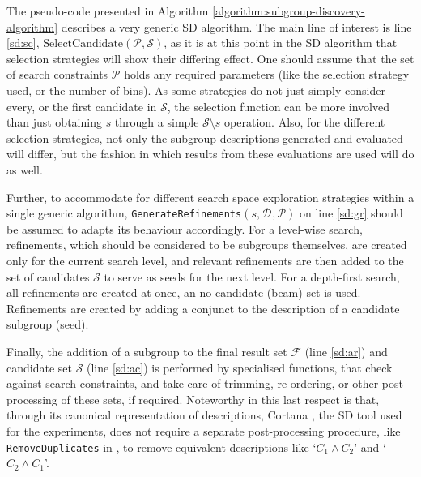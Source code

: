 \documentclass[smallextended]{svjour3}
\newcommand{\subgroup}[1]{\mbox{`$#1$'}}
\newcommand{\ds}[1]{\mathcal{D}_{#1}}
\newcommand{\sd}{SD}
\begin{document}
The pseudo-code presented in Algorithm \ref{algorithm:subgroup-discovery-algorithm} describes a very generic \sd{} algorithm.
The main line of interest is line \ref{sd:sc}, \texttt{$\text{SelectCandidate}(\mathcal{P}, \mathcal{S})$}, as it is at this point in the \sd{} algorithm that selection strategies will show their differing effect.
One should assume that the set of search constraints $\mathcal{P}$ holds any required parameters (like the selection strategy used, or the number of bins).
As some strategies do not just simply consider every, or the first candidate in $\mathcal{S}$, the selection function can be more involved than just obtaining $s$ through a simple $\mathcal{S} \setminus {s}$ operation.
Also, for the different selection strategies, not only the subgroup descriptions generated and evaluated will differ, but the fashion in which results from these evaluations are used will do as well.

Further, to accommodate for different search space exploration strategies within a single generic algorithm, \texttt{GenerateRefinements$(s, \ds{}, \mathcal{P})$} on line \ref{sd:gr} should be assumed to adapts its behaviour accordingly.
For a level-wise search, refinements, which should be considered to be subgroups themselves, are created only for the current search level, and relevant refinements are then added to the set of candidates $\mathcal{S}$ to serve as seeds for the next level.
For a depth-first search, all refinements are created at once, an no candidate (beam) set is used.
Refinements are created by adding a conjunct to the description of a candidate subgroup (seed).

Finally, the addition of a subgroup to the final result set $\mathcal{F}$ (line \ref{sd:ar}) and candidate set $\mathcal{S}$ (line \ref{sd:ac}) is performed by specialised functions, that check against search constraints, and take care of trimming, re-ordering, or other post-processing of these sets, if required.
Noteworthy in this last respect is that, through its canonical representation of descriptions, Cortana \cite{meeng:2011:cortana}, the \sd{} tool used for the experiments, does not require a separate post-processing procedure, like \texttt{RemoveDuplicates} in \cite{leeuwen:2012}, to remove equivalent descriptions like \subgroup{C_1 \wedge C_2} and \subgroup{C_2 \wedge C_1}.%
\end{document}
